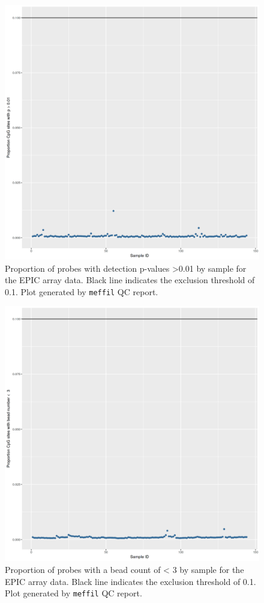 \documentclass[
]{book}
\begin{document}
\begin{figure}

{\centering \includegraphics[width=0.8\linewidth]{figs/MAVIDOSqcEPICpropSites} 

}

\caption{Proportion of probes with detection p-values \textgreater0.01 by sample for the EPIC array data. Black line indicates the exclusion threshold of 0.1. Plot generated by \texttt{meffil} QC report.}\label{fig:MAVIDOSqcEPICpropSites}
\end{figure}



\begin{figure}

{\centering \includegraphics[width=0.8\linewidth]{figs/MAVIDOSqcEPICbeadNum} 

}

\caption{Proportion of probes with a bead count of \textless{} 3 by sample for the EPIC array data. Black line indicates the exclusion threshold of 0.1. Plot generated by \texttt{meffil} QC report.}\label{fig:MAVIDOSqcEPICbeadNum}
\end{figure}
\end{document}
